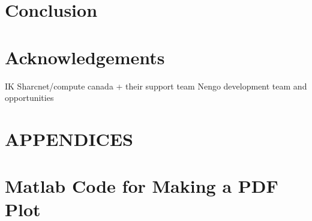 \documentclass[letterpaper,12pt,titlepage,oneside,final]{scrbook}
\let\origdoublepage\cleardoublepage
\newcommand{\clearemptydoublepage}{%
  \clearpage{\pagestyle{empty}\origdoublepage}}
\let\cleardoublepage\clearemptydoublepage
\begin{document}
\chapter{Conclusion}

\chapter{Acknowledgements}
IK
Sharcnet/compute canada + their support team
Nengo development team and opportunities


%
\cleardoublepage %
\renewcommand*{\bibname}{References}



\printbibliography

\appendix
\chapter*{APPENDICES}
\chapter[PDF Plots From Matlab]{Matlab Code for Making a PDF Plot}
\label{AppendixA}
\end{document}
